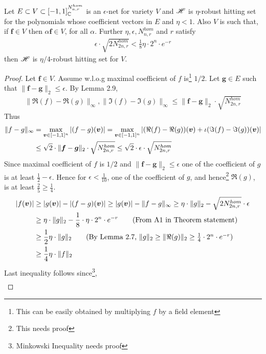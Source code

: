 {\begin{lemma}
Let $E\subset V\subset[-1,1]^{N_{n,r}^{hom}}_{\mathbb{C}}$ is an $\epsilon$-net for variety $V$ and $\mathscr{H}$ is $\eta$-robust hitting set for the polynomials whose coefficient vectors in $E$ and $\eta<1$. Also $V$ is such that, if $\bm f \in V$ then $\alpha \bm f \in V$, for all $\alpha$. Further $\eta, \epsilon, N^{hom}_{n,r}$ and $r$ satisfy
\begin{align*}
\epsilon\cdot\sqrt{2N_{2n,r}^{hom}}<\frac{1}{8}\eta\cdot 2^n\cdot e^{-r}\tag{A1}
\end{align*}
then $\mathscr{H}$ is $\eta/4$-robust hitting set for $V$.
\end{lemma}
\begin{proof}
Let $\bm f \in V$. Assume w.l.o.g maximal coefficient of $f$ is\footnote{This can be easily obtained by multiplying $f$ by a field element} $1/2$. Let $\bm g \in E$ such that $\|\bm f - \bm g\|_2 \le \epsilon$. By Lemma 2.9,
\begin{align*}
\|\Re(f)-\Re(g)\|_\infty, \|\Im(f)-\Im(g)\|_\infty \le \|\bm f- \bm g\|_2\cdot\sqrt{N_{2n,r}^{hom}}
\end{align*}
Thus 
\begin{align*}
\|f-g\|_{\infty}&=\max_{\bm v\in[-1,1]^n}|(f-g)(\bm v)| =\max_{\bm v\in[-1,1]^n}|(\Re(f)-\Re(g))(\bm v) + \iota (\Im(f)-\Im(g))(\bm v)|\\
&\le \sqrt{2}\cdot \|\bm f- \bm g\|_2\cdot\sqrt{N_{2n,r}^{hom}} \le \sqrt{2}\cdot \epsilon \cdot\sqrt{N_{2n,r}^{hom}}
\end{align*}
Since maximal coefficient of $f$ is $1/2$ and $\|\bm{f}-\bm{g}\|_2 \le \epsilon$ one of the coefficient of $g$ is at least $\frac{1}{2}-\epsilon$. Hence for $\epsilon<\frac{1}{10}$, one of the coefficient of $g$, and hence\footnote{This needs proof} $\Re(g)$, is at least $\frac{2}{5}\ge \frac{1}{4}$. 
\begin{align*}
|f(\VEC v)|&\ge |g(\VEC v)|-|(f-g)(\VEC v)| \ge |g(\VEC v)|-\|f-g\|_\infty \ge \eta\cdot\|g\|_2-\sqrt{2N_{2n,r}^{hom}}\cdot\epsilon\\
&\ge\eta\cdot\|g\|_2 - \frac{1}{8}\cdot\eta\cdot 2^{n}\cdot e^{-r} \tag{From A1 in Theorem statement}\\
&\ge\frac{1}{2} \eta \cdot \|g\|_2\tag{By Lemma 2.7, $\|g\|_2\ge\|\Re(g)\|_2\ge \frac{1}{4}\cdot2^{n}\cdot e^{-r}$}\\
&\ge\frac{1}{4}\eta\cdot\|f\|_2
\end{align*}
Last inequality follows since\footnote{Minkowski Inequality needs proof},
\begin{align*}

\end{align*}
\end{proof}}
